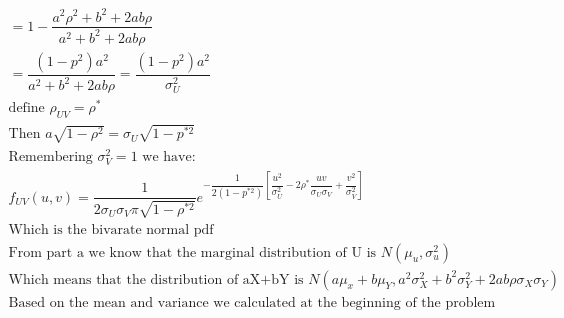 \documentclass{article}
\begin{document}
\begin{flushleft}
\begin{enumerate}[(a)]
\begin{multline*}
=1-\dfrac{a^2\rho^2+b^2+2ab\rho}{a^2+b^2+2ab\rho}\\
=\dfrac{(1-p^2)a^2}{a^2+b^2+2ab\rho}=\dfrac{(1-p^2)a^2}{\sigma^2_U}\\
\text{define } \rho_{UV}=\rho^*\\
\text{Then } a\sqrt{1-\rho^2}=\sigma_U\sqrt{1-p^{*2}}\\
\text{Remembering } \sigma_V^2=1 \text{ we have:}\\
f_{UV}(u,v)=\dfrac{1}{2\sigma_U \sigma_V\pi\sqrt{1-\rho^{*2}}}e^{-\dfrac{1}{2(1-p^{*2})}\left[\dfrac{u^2}{\sigma_U^2}-2\rho^{*}\dfrac{uv}{\sigma_U\sigma_V}+\dfrac{v^2}{\sigma_V^2} \right]}\\
\text{Which is the bivarate normal pdf}\\
\text{From part a we know  that the marginal distribution of U is } N(\mu_u,\sigma^2_u)\\
\text{Which means that the distribution of aX+bY} \text{ is } N(a\mu_x+b\mu_Y,a^2\sigma^2_X+b^2\sigma^2_Y+2ab\rho\sigma_X\sigma_Y)\\
\text{Based on the mean and variance we calculated at the beginning of the problem}\\
\end{multline*}
\end{enumerate}

\end{flushleft}
\end{document}
